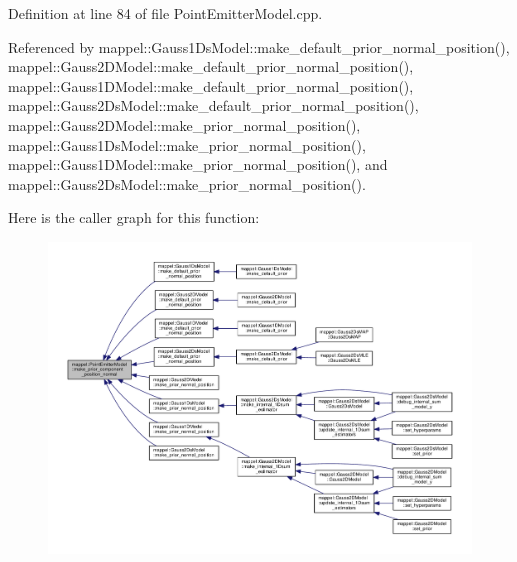 Definition at line 84 of file Point\+Emitter\+Model.\+cpp.



Referenced by mappel\+::\+Gauss1\+Ds\+Model\+::make\+\_\+default\+\_\+prior\+\_\+normal\+\_\+position(), mappel\+::\+Gauss2\+D\+Model\+::make\+\_\+default\+\_\+prior\+\_\+normal\+\_\+position(), mappel\+::\+Gauss1\+D\+Model\+::make\+\_\+default\+\_\+prior\+\_\+normal\+\_\+position(), mappel\+::\+Gauss2\+Ds\+Model\+::make\+\_\+default\+\_\+prior\+\_\+normal\+\_\+position(), mappel\+::\+Gauss2\+D\+Model\+::make\+\_\+prior\+\_\+normal\+\_\+position(), mappel\+::\+Gauss1\+Ds\+Model\+::make\+\_\+prior\+\_\+normal\+\_\+position(), mappel\+::\+Gauss1\+D\+Model\+::make\+\_\+prior\+\_\+normal\+\_\+position(), and mappel\+::\+Gauss2\+Ds\+Model\+::make\+\_\+prior\+\_\+normal\+\_\+position().



Here is the caller graph for this function\+:\nopagebreak
\begin{figure}[H]
\begin{center}
\leavevmode
\includegraphics[width=350pt]{classmappel_1_1PointEmitterModel_ab99350cf74097c558f7a93b79e7a44c3_icgraph}
\end{center}
\end{figure}


